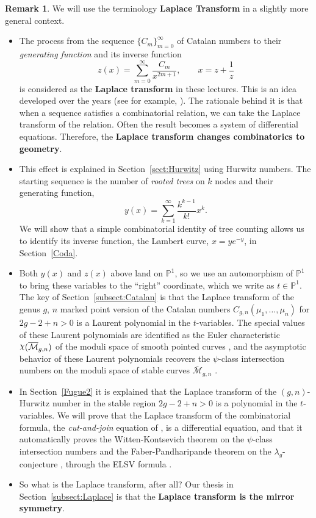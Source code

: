 \documentclass{amsart}
\theoremstyle{definition}
\newtheorem{rem}[thm]{Remark}
\numberwithin{equation}{section}
\numberwithin{figure}{section}
\def\rchi{{\hbox{\raise1.5pt\hbox{$\chi$}}}}
\newcommand{\Mbar}{{\overline{\mathcal{M}}}}
\newcommand{\bP}{{\mathbb{P}}}
\newcommand{\bite}{\begin{itemize}}
\newcommand{\eite}{\end{itemize}}
\begin{document}
\begin{rem} We will use the terminology \textbf{Laplace Transform}
in a slightly more general context.
\bite

\item The process from the sequence $\{C_m\}_{m=0}^\infty$
of Catalan numbers
to their \emph{generating function} and its inverse function
$$
z(x) = \sum_{m=0}^\infty \frac{C_m}{x^{2m+1}}, \qquad x=z+\frac{1}{z}
$$
is considered as the \textbf{Laplace transform} in these lectures. 
This is an idea developed over the years (see for example, \cite{CMS,DMSS, MP2012,MS2008,MS2015,MZ}).
The rationale behind it 
is that when a sequence satisfies a combinatorial relation,  we can take
the Laplace transform of the relation. Often the result becomes
a system of differential equations. Therefore, the \textbf{Laplace transform
changes combinatorics to geometry}. 

\item This effect is explained  in Section~\ref{sect:Hurwitz}
using Hurwitz numbers.
The starting sequence is the number of \emph{rooted trees} on 
$k$ nodes and their generating function, 
$$
y(x) = \sum_{k=1}^\infty \frac{k^{k-1}}{k!} x^k. 
$$
We will show that a simple combinatorial identity of tree counting 
allows us to identify its inverse function, the Lambert curve, $x=y e^{-y}$,
in Section~\ref{Coda}.

\item Both $y(x)$ and $z(x)$ above land on $\bP^1$, so we use an automorphism of
$\bP^1$ to bring these variables to the ``right'' coordinate, which we write
as $t\in \bP^1$. The key of Section~\ref{subsect:Catalan} is that
the Laplace transform of the genus $g$, $n$ marked point version of the 
Catalan numbers $C_{g,n}(\mu_1,\dots,\mu_n)$ 
for $2g-2+n>0$ is a Laurent polynomial
in the $t$-variables. The special values of these Laurent polynomials 
are identified as the Euler characteristic $\rchi(\Mbar_{g,n})$ of the
moduli space of smooth pointed curves \cite{MP2012}, and
the asymptotic behavior of these Laurent polynomials recovers the 
$\psi$-class intersection numbers on the moduli space of 
stable curves $\Mbar_{g,n}$ \cite{CMS}.

\item In Section~\ref{Fugue2} it is explained
that the Laplace transform of the $(g,n)$-Hurwitz number in the 
stable region $2g-2+n>0$ is a polynomial in the $t$-variables. 
 We will prove that the Laplace transform of the combinatorial
formula, the \emph{cut-and-join} equation of \cite{GJ,V}, 
is a differential equation, and that it automatically
proves the Witten-Kontsevich theorem
on the $\psi$-class intersection numbers  and the Faber-Pandharipande theorem
on the $\lambda_g$-conjecture \cite{MZ}, through the ELSV formula
\cite{ELSV}.

\item So what is the Laplace transform, after all? Our thesis
in Section~\ref{subsect:Laplace}  is that the
\textbf{Laplace transform is the mirror symmetry}. 
\eite
\end{rem}
\end{document}
